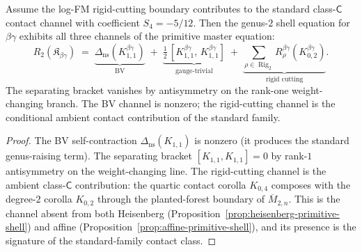 \begin{proposition}
\label{prop:betagamma-primitive-shell}
\ClaimStatusConditional
{}
Assume the log-FM rigid-cutting boundary contributes to the standard
class-$\mathsf C$ contact channel with coefficient $S_4=-5/12$.
Then the genus-$2$ shell equation for $\beta\gamma$ exhibits all
three channels of the primitive master equation:
\begin{equation}\label{eq:betagamma-shell-genus2}
R_2(\mathfrak{K}_{\beta\gamma})
\;=\;
\underbrace{\Delta_{\mathrm{ns}}(K_{1,1}^{\beta\gamma})}_{\text{BV}}
\;+\;
\underbrace{\tfrac{1}{2}\,
[K_{1,1}^{\beta\gamma},\,K_{1,1}^{\beta\gamma}]}_{\text{gauge-trivial}}
\;+\;
\underbrace{\sum_{\rho \in \operatorname{Rig}_2}
R_\rho^{\beta\gamma}(K_{0,2}^{\beta\gamma})}_{\text{rigid cutting}}.
\end{equation}
The separating bracket vanishes by antisymmetry on the rank-one
weight-changing branch. The BV channel is nonzero; the rigid-cutting
channel is the conditional ambient contact contribution of the
standard family.
\end{proposition}

\begin{proof}
The BV self-contraction $\Delta_{\mathrm{ns}}(K_{1,1})$ is nonzero
(it produces the standard genus-raising term). The separating
bracket $[K_{1,1}, K_{1,1}] = 0$ by rank-$1$ antisymmetry on the
weight-changing line. The rigid-cutting channel is the ambient
class-$\mathsf C$ contribution: the quartic contact corolla
$K_{0,4}$ composes with the degree-$2$ corolla $K_{0,2}$ through the
planted-forest boundary of $\overline{M}_{2,n}$. This is the channel absent
from both Heisenberg
(Proposition~\ref{prop:heisenberg-primitive-shell})
and affine
(Proposition~\ref{prop:affine-primitive-shell}), and its
presence is the signature of the standard-family contact class.
\end{proof}

